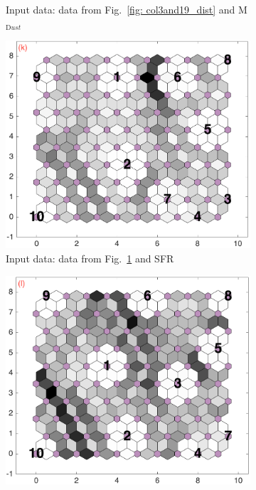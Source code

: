 \begin{figure}
\begin{subfigure}[b]{0.25\textwidth}
          \caption{Input data: data from Fig.~\ref{fig: col3and19_dist} and M$_{{\mathrm Dust}}$}
        \label{fig: col3and20_dist}
    \end{subfigure}        \hfill
    \begin{subfigure}[b]{0.25\textwidth}
        \centering
        \includegraphics[width=\textwidth]{../../images0.01/M31/2D/diff_dimension/combine_2D_data_between_cols3and21.png}
        \caption{Input data: data from Fig.~\ref{fig: col3and20_dist} and SFR}
        \label{fig: col3and21_dist}
    \end{subfigure}
            \hfill
    \begin{subfigure}[b]{0.25\textwidth}
        \centering
        \includegraphics[width=\textwidth]{../../images0.01/M31/2D/diff_dimension/combine_2D_data_between_cols3and22.png}

\end{subfigure}
\end{figure}
